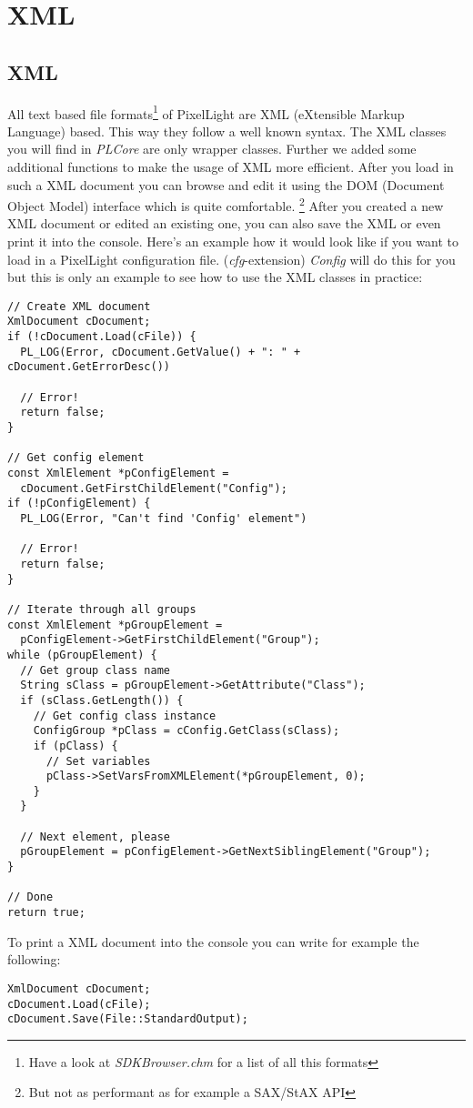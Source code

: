 \chapter{XML}




\section{XML}
All text based file formats\footnote{Have a look at \emph{SDKBrowser.chm} for a list of all this formats} of PixelLight are XML (eXtensible Markup Language) based. This way they follow a well known syntax. The XML classes you will find in \emph{PLCore} are only wrapper classes. Further we added some additional functions to make the usage of XML more efficient. After you load in such a XML document you can browse and edit it using the DOM (Document Object Model) interface which is quite comfortable. \footnote{But not as performant as for example a SAX/StAX API} After you created a new XML document or edited an existing one, you can also save the XML or even print it into the console. Here's an example how it would look like if you want to load in a PixelLight configuration file. (\emph{cfg}-extension) \emph{Config} will do this for you but this is only an example to see how to use the XML classes in practice:

\begin{lstlisting}[caption=XML DOM usage example]
// Create XML document
XmlDocument cDocument;
if (!cDocument.Load(cFile)) {
  PL_LOG(Error, cDocument.GetValue() + ": " + cDocument.GetErrorDesc())

  // Error!
  return false;
}

// Get config element
const XmlElement *pConfigElement =
  cDocument.GetFirstChildElement("Config");
if (!pConfigElement) {
  PL_LOG(Error, "Can't find 'Config' element")

  // Error!
  return false;
}

// Iterate through all groups
const XmlElement *pGroupElement =
  pConfigElement->GetFirstChildElement("Group");
while (pGroupElement) {
  // Get group class name
  String sClass = pGroupElement->GetAttribute("Class");
  if (sClass.GetLength()) {
    // Get config class instance
    ConfigGroup *pClass = cConfig.GetClass(sClass);
    if (pClass) {
      // Set variables
      pClass->SetVarsFromXMLElement(*pGroupElement, 0);
    }
  }

  // Next element, please
  pGroupElement = pConfigElement->GetNextSiblingElement("Group");
}

// Done
return true;
\end{lstlisting}

To print a XML document into the console you can write for example the following:

\begin{lstlisting}[caption=Print XML document into the console]
XmlDocument cDocument;
cDocument.Load(cFile);
cDocument.Save(File::StandardOutput);
\end{lstlisting}

